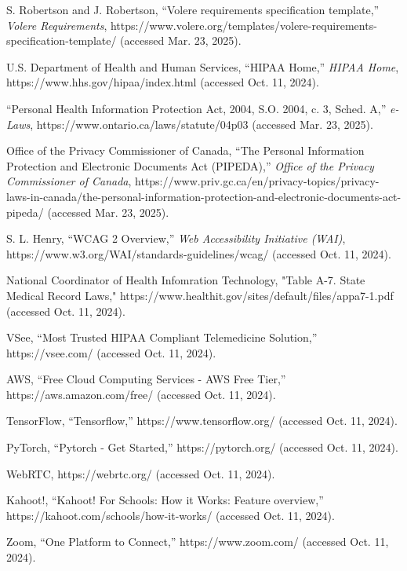 \documentclass[12pt]{article}
\begin{document}
\begin{thebibliography}{9}

  S. Robertson and J. Robertson, “Volere requirements specification template,” \textit{Volere Requirements}, https://www.volere.org/templates/volere-requirements-specification-template/ (accessed Mar. 23, 2025). 

  U.S. Department of Health and Human Services, “HIPAA Home,” \textit{HIPAA Home}, https://www.hhs.gov/hipaa/index.html (accessed Oct. 11, 2024).

  “Personal Health Information Protection Act, 2004, S.O. 2004, c. 3, Sched. A,” \textit{e-Laws}, https://www.ontario.ca/laws/statute/04p03 (accessed Mar. 23, 2025). 

  Office of the Privacy Commissioner of Canada, “The Personal Information Protection and Electronic Documents Act (PIPEDA),” \textit{Office of the Privacy Commissioner of Canada}, https://www.priv.gc.ca/en/privacy-topics/privacy-laws-in-canada/the-personal-information-protection-and-electronic-documents-act-pipeda/ (accessed Mar. 23, 2025). 
  
  S. L. Henry, “WCAG 2 Overview,” \textit{Web Accessibility Initiative (WAI)}, https://www.w3.org/WAI/standards-guidelines/wcag/ (accessed Oct. 11, 2024).

  National Coordinator of Health Infomration Technology, "Table A-7. State Medical Record Laws," https://www.healthit.gov/sites/default/files/appa7-1.pdf (accessed Oct. 11, 2024). 
  
  VSee, “Most Trusted HIPAA Compliant Telemedicine Solution,” https://vsee.com/ (accessed Oct. 11, 2024).
  
  AWS, “Free Cloud Computing Services - AWS Free Tier,” https://aws.amazon.com/free/ (accessed Oct. 11, 2024).

  TensorFlow, “Tensorflow,” https://www.tensorflow.org/ (accessed Oct. 11, 2024).
  
  PyTorch, “Pytorch - Get Started,” https://pytorch.org/ (accessed Oct. 11, 2024).
  
  WebRTC, https://webrtc.org/ (accessed Oct. 11, 2024).
  
  Kahoot!, “Kahoot! For Schools: How it Works: Feature overview,” https://kahoot.com/schools/how-it-works/ (accessed Oct. 11, 2024).
  
  Zoom, “One Platform to Connect,” https://www.zoom.com/ (accessed Oct. 11, 2024).
  
  \end{thebibliography}
  
\end{document}
